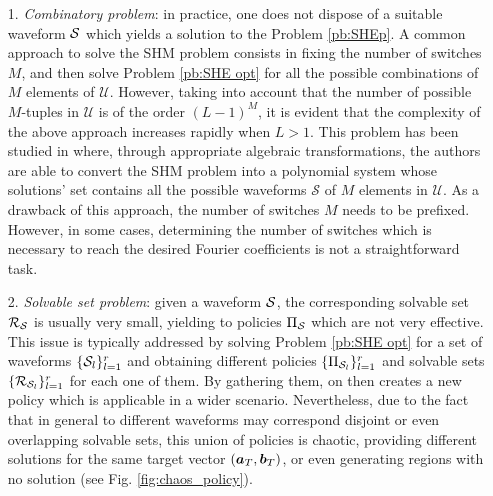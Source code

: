 \documentclass[twocolumn]{autart}    %
\begin{document}
\begin{itemize}
	\item[1.] \textit{Combinatory problem}: in practice, one does not dispose of a suitable waveform $\mathcal{S}$ which yields a solution to the Problem \ref{pb:SHEp}. A common approach to solve the SHM problem consists in fixing the number of switches $M$, and then solve Problem \ref{pb:SHE opt} for  all the possible combinations of $M$ elements of $\mathcal{U}$. However, taking into account that the number of possible $M$-tuples  in $\mathcal U$ is of the order $(L-1)^M$, it is evident that the complexity of the above approach increases rapidly when $L>1$. This problem has been studied in \cite{Yang2015} where, through appropriate algebraic transformations, the authors are able to convert the SHM problem into a polynomial system whose solutions' set contains all the possible waveforms $\mathcal S$ of $M$ elements in $\mathcal{U}$. As a drawback of this approach, the number of switches $M$ needs to be prefixed. However, in some cases,  determining the number of switches which is necessary to reach the desired Fourier coefficients is not a straightforward task.
	
	\item[2.] \textit{Solvable set problem}: given a waveform $\mathcal{S}$, the corresponding solvable set $\mathcal{R}_{\mathcal{S}}$ is usually very small, yielding to policies $\Pi_{\mathcal{S}}$ which are not very effective. This issue is typically addressed by solving Problem \ref{pb:SHE opt} for a set of waveforms $\{\mathcal{S}_l\}_{l=1}^r$ and obtaining different policies $\{\Pi_{\mathcal{S}_l}\}_{l=1}^r$ and solvable sets $\{\mathcal{R}_{\mathcal{S}_l}\}_{l=1}^r$ for each one of them. By gathering them, on then creates a new policy which is applicable in a wider scenario. Nevertheless, due to the fact that in general to different waveforms may correspond disjoint or even overlapping solvable sets, this union of policies is chaotic, providing different solutions for the same target vector $(\bm{a}_T,\bm{b}_T)$, or even generating regions with no solution (see Fig. \ref{fig:chaos_policy}).
	

\end{itemize}
\end{document}
